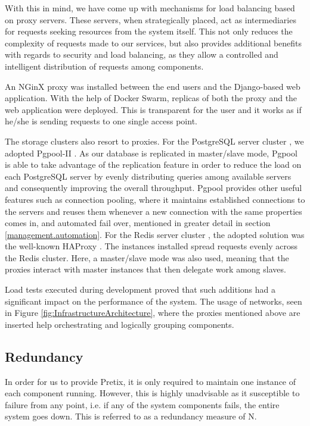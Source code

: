 \documentclass[12pt]{article}
\begin{document}
With this in mind, we have come up with mechanisms for load balancing based on proxy servers.
These servers, when strategically placed, act as intermediaries for requests seeking resources from the system itself.
This not only reduces the complexity of requests made to our services, but also provides additional benefits with regards to security and load balancing,
as they allow a controlled and intelligent distribution of requests among components.

An NGinX proxy \cite{nginx} was installed between the end users and the Django-based web application.
With the help of Docker Swarm, replicas of both the proxy and the web application were deployed.
This is transparent for the user and it works as if he/she is sending requests to one single access point.

The storage clusters also resort to proxies.
For the PostgreSQL server cluster \cite{postgresql}, we adopted Pgpool-II \cite{pgpool}.
As our database is replicated in master/slave mode, Pgpool is able to take advantage of the replication feature in order to reduce the load on each PostgreSQL server
by evenly distributing queries among available servers and consequently improving the overall throughput.
Pgpool provides other useful features such as connection pooling, where it maintains established connections to the servers and reuses them whenever a new
connection with the same properties comes in, and automated fail over, mentioned in greater detail in section \ref{management.automation}.
For the Redis server cluster \cite{redis}, the adopted solution was the well-known HAProxy \cite{haproxy}.
The instances installed spread requests evenly across the Redis cluster. 
Here, a master/slave mode was also used, meaning that the proxies interact with master instances that then delegate work among slaves.

Load tests executed during development proved that such additions had a significant impact on the performance of the system.
The usage of networks, seen in Figure \ref{fig:InfrastructureArchitecture}, where the proxies mentioned above are inserted help orchestrating and logically
grouping components.

\subsection{Redundancy} \label{architecture.redundancy} %


In order for us to provide Pretix, it is only required to maintain one instance of each component running.
However, this is highly unadvisable as it susceptible to failure from any point, i.e. if any of the system components fails, the entire system goes down.
This is referred to as a redundancy measure of N.
\end{document}
